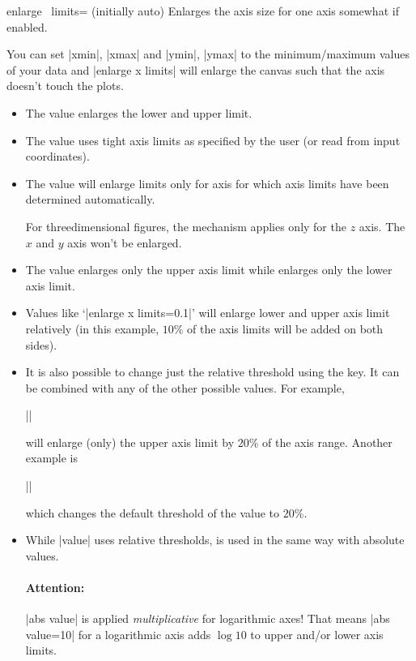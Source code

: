 \begin{pgfplotsxykey}{enlarge \x\ limits= (initially auto)}
Enlarges the axis size for one axis somewhat if enabled.

You can set |xmin|, |xmax| and |ymin|, |ymax| to the minimum/maximum values of your data and |enlarge x limits| will enlarge the canvas such that the axis doesn't touch the plots.

\begin{itemize}
	\item The value  enlarges the lower and upper limit.
	\item The value  uses tight axis limits as specified by the user (or read from input coordinates).
	\item The value  will enlarge limits only for axis for which axis limits have been determined automatically.

	For threedimensional figures, the  mechanism applies only for the $z$ axis. The $x$ and $y$ axis won't be enlarged. 
	\item The value  enlarges only the upper axis limit while  enlarges only the lower axis limit.
	\item Values like `|enlarge x limits=0.1|' will enlarge lower and upper axis limit relatively (in this example, $10\%$ of the axis limits will be added on both sides).
	\item It is also possible to change just the relative threshold using the  key. It can be combined with any of the other possible values. For example, 

		||
	
	will enlarge (only) the upper axis limit by $20\%$ of the axis range. Another example is

		||

	which changes the default threshold of the  value to $20\%$.
	\item While |value| uses relative thresholds,  is used in the same way with absolute values.

	\paragraph{Attention:} |abs value| is applied \emph{multiplicative} for logarithmic axes! That means |abs value=10| for a logarithmic axis adds $\log 10$ to upper and/or lower axis limits.


\end{itemize}
\end{pgfplotsxykey}
